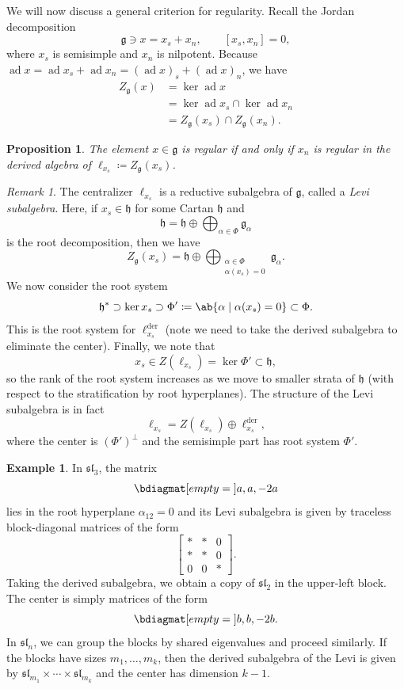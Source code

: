 \documentclass{amsart}
\newtheorem{prop}[thm]{Proposition}
\theoremstyle{definition}
\newtheorem{exm}[thm]{Example}
\theoremstyle{remark}
\newtheorem{rmk}[thm]{Remark}
\theoremstyle{plain}
\theoremstyle{definition}
\theoremstyle{remark}
\newcommand{\g}{\mathfrak{g}}
\newcommand{\h}{\mathfrak{h}}
\newcommand{\mf}[1]{\mathfrak{#1}}
\newcommand{\on}[1]{\operatorname{#1}}
\newcommand{\1}{\mathbf{1}}
\newcommand{\2}{\mathbf{2}}
\newcommand{\3}{\mathbf{3}}
\renewcommand{\sl}{\mf{sl}}
\DeclareMathOperator{\ad}{ad}
\begin{document}
We will now discuss a general criterion for regularity. Recall the Jordan decomposition
\[ \g \ni x = x_s + x_n, \qquad [x_s, x_n] = 0, \]
where \(x_s\) is semisimple and \(x_n\) is nilpotent. Because \(\ad x = \ad x_s + \ad x_n = (\ad x)_s + (\ad x)_n\), we have 
\begin{align*}
    Z_{\g}(x) &= \ker \ad x \\
    &= \ker \ad x_s \cap \ker \ad x_n \\
    &= Z_{\g}(x_s) \cap Z_{\g}(x_n).
\end{align*}

\begin{prop}\label{prop:regularity-criterion}
    The element \(x \in \g\) is regular if and only if \(x_n\) is regular in the derived algebra of \(\ell_{x_s} \coloneqq Z_{\g}(x_s)\).
\end{prop}

\begin{rmk}
    The centralizer \(\ell_{x_s}\) is a reductive subalgebra of \(\g\), called a \textit{Levi subalgebra}. Here, if \(x_s \in \h\) for some Cartan \(\h\) and 
    \[ \h = \h \oplus \bigoplus_{\alpha \in \Phi} \g_{\alpha} \]
    is the root decomposition, then we have
    \[ Z_{\g}(x_s) = \h \oplus \bigoplus_{\substack{\alpha \in \Phi \\ \alpha(x_s) = 0}} \g_{\alpha}. \]
    We now consider the root system
    \[ \h^* \supset \ker x_s \supset \Phi' \coloneqq \ab\{ \alpha \mid \alpha(x_s) = 0 \} \subset \Phi. \]
    This is the root system for \(\ell_{x_s}^{\on{der}}\) (note we need to take the derived subalgebra to eliminate the center). Finally, we note that
    \[ x_s \in Z(\ell_{x_s}) = \ker \Phi' \subset \h, \]
    so the rank of the root system increases as we move to smaller strata of \(\h\) (with respect to the stratification by root hyperplanes). The structure of the Levi subalgebra is in fact
    \[ \ell_{x_s} = Z(\ell_{x_s}) \oplus \ell_{x_s}^{\on{der}}, \]
    where the center is \((\Phi')^{\perp}\) and the semisimple part has root system \(\Phi'\).
\end{rmk}

\begin{exm}
    In \(\sl_3\), the matrix
    \[ \bdiagmat[empty={}]{a,a,-2a} \]
    lies in the root hyperplane \(\alpha_{12} = 0\) and its Levi subalgebra is given by traceless block-diagonal matrices of the form
    \[ \begin{bmatrix}
        * & * & 0 \\
        * & * & 0 \\
        0 & 0 & *
    \end{bmatrix}. \]
    Taking the derived subalgebra, we obtain a copy of \(\sl_2\) in the upper-left block. The center is simply matrices of the form
    \[ \bdiagmat[empty={}]{b,b,-2b}. \]
    In \(\sl_n\), we can group the blocks by shared eigenvalues and proceed similarly. If the blocks have sizes \(m_1, \ldots, m_k\), then the derived subalgebra of the Levi is given by \(\sl_{m_1} \times \cdots \times \sl_{m_k}\) and the center has dimension \(k-1\).
\end{exm}
\end{document}
